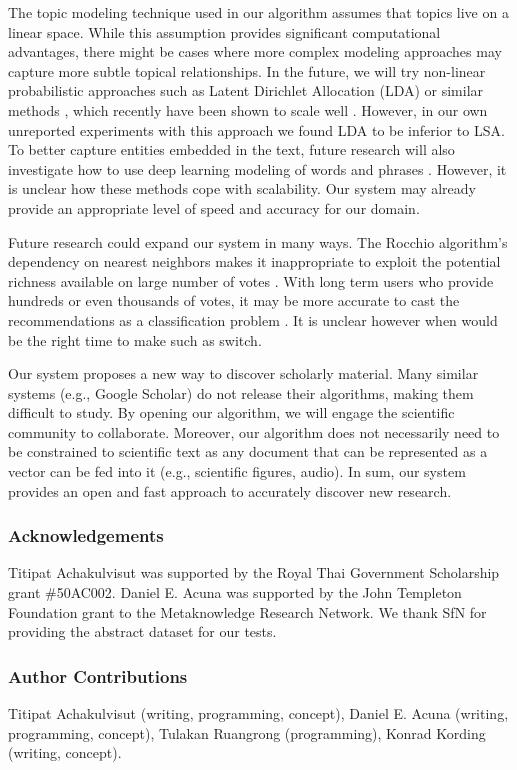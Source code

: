 \documentclass[a4paper]{article}
\begin{document}
The topic modeling technique used in our algorithm assumes that topics live on a linear space. While this assumption provides significant computational advantages, there might be cases where more complex modeling approaches may capture more subtle topical relationships. In the future, we will try non-linear probabilistic approaches such as Latent Dirichlet Allocation (LDA) or similar methods \cite{blei2003latent, lancichinetti2015high}, which recently have been shown to scale well \cite{hoffman2010online}. However, in our own unreported experiments with this approach we found LDA to be inferior to LSA. To better capture entities embedded in the text, future research will also investigate how to use deep learning modeling of words and phrases \cite{mikolov2013efficient, pennington2014glove}. However, it is unclear how these methods cope with scalability. Our system may already provide an appropriate level of speed and accuracy for our domain.


Future research could expand our system in many ways. The Rocchio algorithm’s dependency on nearest neighbors makes it inappropriate to exploit the potential richness available on large number of votes \cite{friedman2001elements}. With long term users who provide hundreds or even thousands of votes, it may be more accurate to cast the recommendations as a classification problem \cite{lavrenko2001relevance}. It is unclear however when would be the right time to make such as switch.

Our system proposes a new way to discover scholarly material. Many similar systems (e.g., Google Scholar) do not release their algorithms, making them difficult to study. By opening our algorithm, we will engage the scientific community to collaborate. Moreover, our algorithm does not necessarily need to be constrained to scientific text as any document that can be represented as a vector can be fed into it (e.g., scientific figures, audio). In sum, our system provides an open and fast approach to accurately discover new research.


\subsubsection*{Acknowledgements}

Titipat Achakulvisut was supported by the Royal Thai Government Scholarship grant \#50AC002. Daniel E. Acuna was supported by the John Templeton Foundation grant to the Metaknowledge Research Network. We thank SfN for providing the abstract dataset for our tests.

\subsubsection*{Author Contributions}

Titipat Achakulvisut (writing, programming, concept), Daniel E. Acuna (writing, programming, concept), Tulakan Ruangrong (programming), Konrad Kording (writing, concept).

{}

\end{document}
